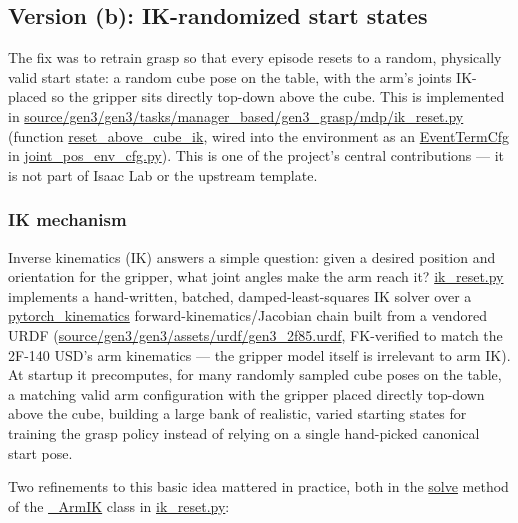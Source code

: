 \documentclass[11pt]{article}
\begin{document}
\subsection{Version (b): IK-randomized start states}

The fix was to retrain grasp so that every episode resets to a random, physically
valid start state: a random cube pose on the table, with the arm's joints IK-placed
so the gripper sits directly top-down above the cube. This is implemented in
\url{source/gen3/gen3/tasks/manager_based/gen3_grasp/mdp/ik_reset.py}
(function \url{reset_above_cube_ik}, wired into the environment as an
\url{EventTermCfg} in \url{joint_pos_env_cfg.py}). This is one of the
project's central contributions --- it is not part of Isaac Lab or the upstream
template.

\subsubsection{IK mechanism}

Inverse kinematics (IK) answers a simple question: given a desired position and
orientation for the gripper, what joint angles make the arm reach it? \url{ik_reset.py}
implements a hand-written, batched, damped-least-squares IK solver over a
\url{pytorch_kinematics} forward-kinematics/Jacobian chain built from a vendored
URDF (\url{source/gen3/gen3/assets/urdf/gen3_2f85.urdf}, FK-verified to match the
2F-140 USD's arm kinematics --- the gripper model itself is irrelevant to arm IK).
At startup it precomputes, for many randomly sampled cube poses on the table, a
matching valid arm configuration with the gripper placed directly top-down above
the cube, building a large bank of realistic, varied starting states for training
the grasp policy instead of relying on a single hand-picked canonical start pose.

Two refinements to this basic idea mattered in practice, both in the \url{solve}
method of the \url{_ArmIK} class in \url{ik_reset.py}:
\end{document}
